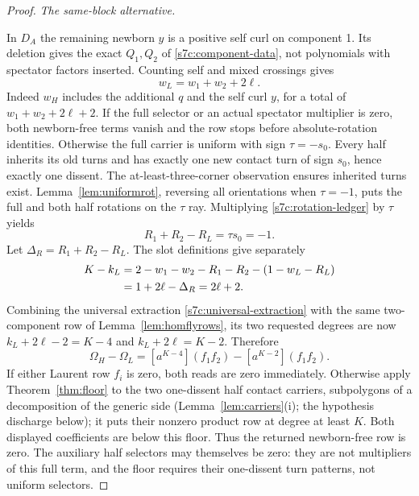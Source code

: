 \begin{proof}
\par\noindent\emph{The same-block alternative.}\par
In $D_A$ the remaining newborn $y$ is a positive self curl on
component 1.  Its deletion gives the exact $Q_1,Q_2$ of
\eqref{s7c:component-data}, not polynomials with spectator factors
inserted.  Counting self and mixed crossings gives
\begin{equation}\label{s7c:noninterlacing-writhe}
 w_L=w_1+w_2+2\ell.
\end{equation}
Indeed $w_H$ includes the additional $q$ and the self curl $y$, for
a total of $w_1+w_2+2\ell+2$.
If the full selector or an actual spectator multiplier is zero, both
newborn-free terms vanish and the row stops before absolute-rotation
identities.  Otherwise the full carrier is uniform with sign
$\tau=-s_0$.  Every half inherits its old turns and has exactly one
new contact turn of sign $s_0$, hence exactly one dissent.  The
at-least-three-corner observation ensures inherited turns exist.
Lemma~\ref{lem:uniformrot}, reversing all orientations when
$\tau=-1$, puts the full and both half rotations on the $\tau$ ray.
Multiplying \eqref{s7c:rotation-ledger} by $\tau$ yields
\begin{equation}\label{s7c:noninterlacing-rotation}
 R_1+R_2-R_L=\tau s_0=-1.
\end{equation}
Let $\Delta_R=R_1+R_2-R_L$.  The slot definitions give separately
\begin{align}
 K-k_L
 &=2-w_1-w_2-R_1-R_2-(1-w_L-R_L)\notag\\
 &=1+2\ell-\Delta_R=2\ell+2.
 \label{s7c:noninterlacing-slot}
\end{align}
Combining the universal extraction \eqref{s7c:universal-extraction}
with the same two-component row of Lemma~\ref{lem:homflyrows}, its two requested degrees
are now $k_L+2\ell-2=K-4$ and $k_L+2\ell=K-2$.
Therefore
\begin{equation}\label{s7c:noninterlacing-extraction}
 \Omega_H-\Omega_L=[a^{K-4}](f_1f_2)-[a^{K-2}](f_1f_2).
\end{equation}
If either Laurent row $f_i$ is zero, both reads are zero immediately.
Otherwise apply Theorem~\ref{thm:floor} to the two one-dissent half
contact carriers, subpolygons of a decomposition of the generic side
(Lemma~\ref{lem:carriers}(i); the hypothesis discharge below); it puts
their nonzero product row at degree at least $K$.
Both displayed coefficients are below this floor.  Thus the returned
newborn-free row is zero.  The auxiliary half selectors may themselves
be zero: they are not multipliers of this full term, and the floor
requires their one-dissent turn patterns, not uniform selectors.




\end{proof}
